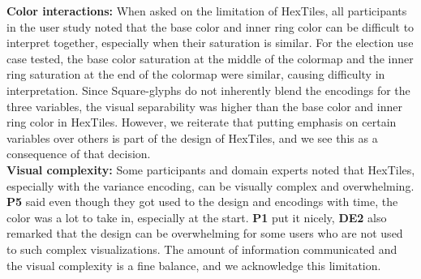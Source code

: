 
\noindent
\textbf{Color interactions: } When asked on the limitation of HexTiles, all participants in the user study noted that the base color and inner ring color can be difficult to interpret together, especially when their saturation is similar. 
%
For the election use case tested, the base color saturation at the middle of the colormap and the inner ring saturation at the end of the colormap were similar, causing difficulty in interpretation.
%
Since Square-glyphs do not inherently blend the encodings for the three variables, the visual separability was higher than the base color and inner ring color in HexTiles.
%
However, we reiterate that putting emphasis on certain variables over others is part of the design of HexTiles, and we see this as a consequence of that decision.
\\
\textbf{Visual complexity: } Some participants and domain experts noted that HexTiles, especially with the variance encoding, can be visually complex and overwhelming.
%
\textbf{P5} said even though they got used to the design and encodings with time, the color was a lot to take in, especially at the start.
%
\textbf{P1} put it nicely, 
%
\textbf{DE2} also remarked that the design can be overwhelming for some users who are not used to such complex visualizations.
%
The amount of information communicated and the visual complexity is a fine balance, and we acknowledge this limitation.

